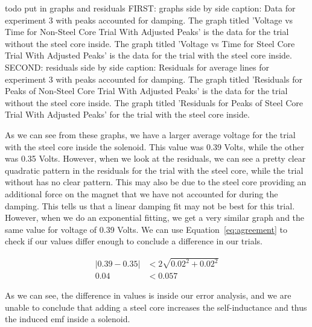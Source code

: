 \documentclass[11pt]{article}
\begin{document}
    todo put in graphs and residuals
    FIRST: graphs side by side
    caption: Data for experiment 3 with peaks accounted for damping. The graph titled 'Voltage vs Time for Non-Steel Core Trial With Adjusted Peaks' is the data for the trial without the steel core inside. The graph titled 'Voltage vs Time for Steel Core Trial With Adjusted Peaks' is the data for the trial with the steel core inside. 
    SECOND: residuals side by side
    caption: Residuals for average lines for experiment 3 with peaks accounted for damping. The graph titled 'Residuals for Peaks of Non-Steel Core Trial With Adjusted Peaks' is the data for the trial without the steel core inside. The graph titled 'Residuals for Peaks of Steel Core Trial With Adjusted Peaks' for the trial with the steel core inside.

    As we can see from these graphs, we have a larger average voltage for the trial with the steel core inside the solenoid. This value was 0.39 Volts, while the other was 0.35 Volts. However, when we look at the residuals, we can see a pretty clear quadratic pattern in the residuals for the trial with the steel core, while the trial without has no clear pattern. This may also be due to the steel core providing an additional force on the magnet that we have not accounted for during the damping. This tells us that a linear damping fit may not be best for this trial. However, when we do an exponential fitting, we get a very similar graph and the same value for voltage of 0.39 Volts. We can use Equation~\ref{eq:agreement} to check if our values differ enough to conclude a difference in our trials.

    \begin{align*}
        |0.39 - 0.35| &< 2 \sqrt{0.02^2 + 0.02^2} \\
        0.04 &< 0.057
    \end{align*}

    As we can see, the difference in values is inside our error analysis, and we are unable to conclude that adding a steel core increases the self-inductance and thus the induced emf inside a solenoid.

    
\end{document}
